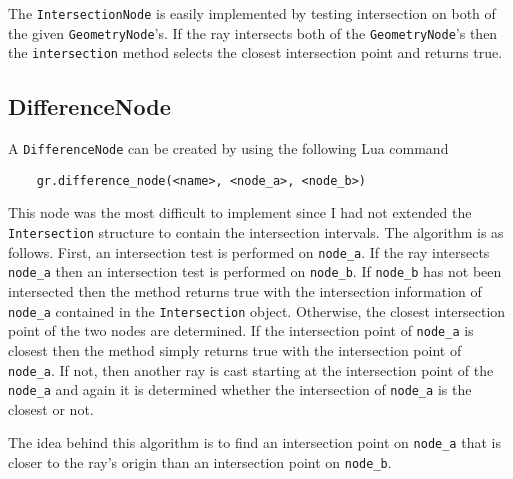 The \verb|IntersectionNode| is easily implemented by testing intersection on
both of the given \verb|GeometryNode|'s. If the ray intersects both of the
\verb|GeometryNode|'s then the \verb|intersection| method selects the closest
intersection point and returns true.

\subsection*{DifferenceNode}
A \verb|DifferenceNode| can be created by using the following Lua command
\begin{verbatim}
    gr.difference_node(<name>, <node_a>, <node_b>)
\end{verbatim}

This node was the most difficult to implement since I had not extended the
\verb|Intersection| structure to contain the intersection intervals. The
algorithm is as follows. First, an intersection test is performed on 
\verb|node_a|. If the ray intersects \verb|node_a| then an intersection test is
performed on \verb|node_b|. If \verb|node_b| has not been intersected then the
method returns true with the intersection information of \verb|node_a| contained
in the \verb|Intersection| object. Otherwise, the closest intersection point of 
the two nodes are determined. If the intersection point of \verb|node_a| is 
closest then the method simply returns true with the intersection point of 
\verb|node_a|. If not, then another ray is cast starting at the intersection
point of the \verb|node_a| and again it is determined whether the intersection
of \verb|node_a| is the closest or not.

The idea behind this algorithm is to find an intersection point on \verb|node_a|
that is closer to the ray's origin than an intersection point on \verb|node_b|.

